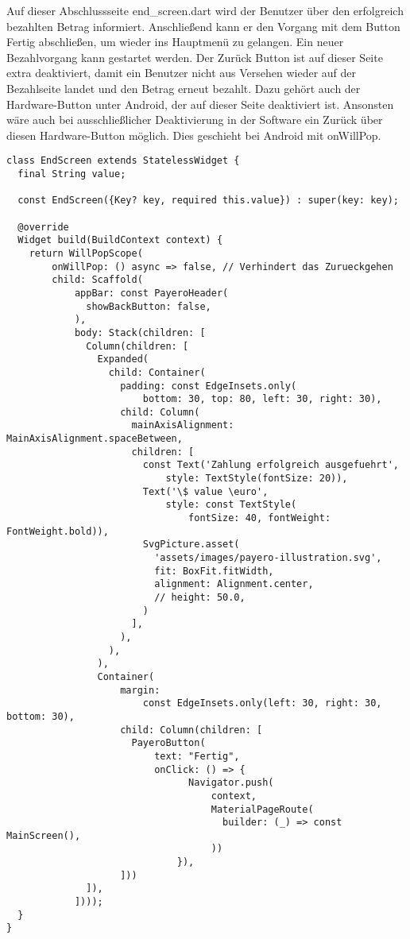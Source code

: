 Auf dieser Abschlussseite \glqq end\_screen.dart\grqq{} wird der Benutzer über den erfolgreich bezahlten Betrag informiert.
Anschließend kann er den Vorgang mit dem Button \glqq Fertig\grqq{} abschließen, um wieder ins Hauptmenü zu gelangen.
Ein neuer Bezahlvorgang kann gestartet werden.
Der \glqq Zurück\grqq{} Button ist auf dieser Seite extra deaktiviert, damit ein Benutzer nicht aus Versehen wieder auf der Bezahlseite landet und den Betrag erneut bezahlt.
Dazu gehört auch der Hardware-Button unter Android, der auf dieser Seite deaktiviert ist.
Ansonsten wäre auch bei ausschließlicher Deaktivierung in der Software ein Zurück über diesen Hardware-Button möglich.
Dies geschieht bei Android mit \glqq onWillPop\grqq{}.

\begin{lstlisting}[caption={EndScreen bei erfolgreichem Bezahlvorgang}]
  class EndScreen extends StatelessWidget {
  final String value;

  const EndScreen({Key? key, required this.value}) : super(key: key);

  @override
  Widget build(BuildContext context) {
    return WillPopScope(
        onWillPop: () async => false, // Verhindert das Zurueckgehen
        child: Scaffold(
            appBar: const PayeroHeader(
              showBackButton: false,
            ),
            body: Stack(children: [
              Column(children: [
                Expanded(
                  child: Container(
                    padding: const EdgeInsets.only(
                        bottom: 30, top: 80, left: 30, right: 30),
                    child: Column(
                      mainAxisAlignment: MainAxisAlignment.spaceBetween,
                      children: [
                        const Text('Zahlung erfolgreich ausgefuehrt',
                            style: TextStyle(fontSize: 20)),
                        Text('\$ value \euro',
                            style: const TextStyle(
                                fontSize: 40, fontWeight: FontWeight.bold)),
                        SvgPicture.asset(
                          'assets/images/payero-illustration.svg',
                          fit: BoxFit.fitWidth,
                          alignment: Alignment.center,
                          // height: 50.0,
                        )
                      ],
                    ),
                  ),
                ),
                Container(
                    margin:
                        const EdgeInsets.only(left: 30, right: 30, bottom: 30),
                    child: Column(children: [
                      PayeroButton(
                          text: "Fertig",
                          onClick: () => {
                                Navigator.push(
                                    context,
                                    MaterialPageRoute(
                                      builder: (_) => const MainScreen(),
                                    ))
                              }),
                    ]))
              ]),
            ])));
  }
}
\end{lstlisting}

